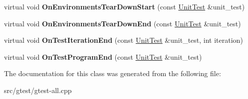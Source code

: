 \begin{DoxyCompactItemize}
virtual void {\bfseries On\+Environments\+Tear\+Down\+Start} (const \mbox{\hyperlink{classtesting_1_1_unit_test}{Unit\+Test}} \&unit\+\_\+test)
\item 
\mbox{\label{classtesting_1_1internal_1_1_test_event_repeater_a8428220c4cf9f0cea2dfd9a70f07ab7f}} 
virtual void {\bfseries On\+Environments\+Tear\+Down\+End} (const \mbox{\hyperlink{classtesting_1_1_unit_test}{Unit\+Test}} \&unit\+\_\+test)
\item 
\mbox{\label{classtesting_1_1internal_1_1_test_event_repeater_a94253e3c11753328e8a031f39352708f}} 
virtual void {\bfseries On\+Test\+Iteration\+End} (const \mbox{\hyperlink{classtesting_1_1_unit_test}{Unit\+Test}} \&unit\+\_\+test, int iteration)
\item 
\mbox{\label{classtesting_1_1internal_1_1_test_event_repeater_a4622616259747dbcc23f5ee39ef99ec0}} 
virtual void {\bfseries On\+Test\+Program\+End} (const \mbox{\hyperlink{classtesting_1_1_unit_test}{Unit\+Test}} \&unit\+\_\+test)
\end{DoxyCompactItemize}


The documentation for this class was generated from the following file\+:\begin{DoxyCompactItemize}
\item 
src/gtest/gtest-\/all.\+cpp\end{DoxyCompactItemize}
